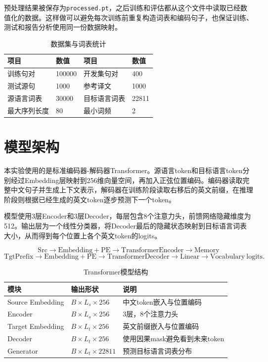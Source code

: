 \documentclass[11pt]{article}
\begin{document}
	预处理结果被保存为\texttt{processed.pt}，之后训练和评估都从这个文件中读取已经数值化的数据。这样做可以避免每次训练前重复构造词表和编码句子，也保证训练、测试和报告分析使用同一份数据映射。

	\begin{table}[H]
		\centering
		\caption{数据集与词表统计}
		\begin{tabular}{M{4.0cm} M{3.2cm} M{4.0cm} M{3.2cm}}
			\toprule
			项目 & 数值 & 项目 & 数值 \\
			\midrule
			训练句对 & 100000 & 开发集句对 & 400 \\
			测试源句 & 1000 & 参考译文 & 1000 \\
			源语言词表 & 30000 & 目标语言词表 & 22811 \\
			最大序列长度 & 80 & 最小词频 & 2 \\
			\bottomrule
		\end{tabular}
	\end{table}

	\section{模型架构}
	本实验使用的是标准编码器-解码器Transformer。源语言token和目标语言token分别经过Embedding层映射到256维向量空间，再加入正弦位置编码。编码器读取完整中文句子并生成上下文表示，解码器在训练阶段读取右移后的英文前缀，在推理阶段则根据已经生成的英文token逐步预测下一个token。

	模型使用3层Encoder和3层Decoder，每层包含8个注意力头，前馈网络隐藏维度为512。输出层为一个线性分类器，将Decoder最后的隐藏状态映射到目标语言词表大小，从而得到每个位置上各个英文token的logits。

	\[
		\mathrm{Src}
		\rightarrow \mathrm{Embedding+PE}
		\rightarrow \mathrm{TransformerEncoder}
		\rightarrow \mathrm{Memory}
	\]
	\[
		\mathrm{TgtPrefix}
		\rightarrow \mathrm{Embedding+PE}
		\rightarrow \mathrm{TransformerDecoder}
		\rightarrow \mathrm{Linear}
		\rightarrow \mathrm{Vocabulary\ logits}.
	\]

	\begin{table}[H]
		\centering
		\caption{Transformer模型结构}
		\begin{tabular}{M{3.4cm} M{3.8cm} M{5.6cm}}
			\toprule
			模块 & 输出形状 & 说明 \\
			\midrule
			Source Embedding & $B\times L_s\times256$ & 中文token嵌入与位置编码 \\
			Encoder & $B\times L_s\times256$ & 3层，8个注意力头 \\
			Target Embedding & $B\times L_t\times256$ & 英文前缀嵌入与位置编码 \\
			Decoder & $B\times L_t\times256$ & 使用因果mask避免看到未来token \\
			Generator & $B\times L_t\times22811$ & 预测目标语言词表分布 \\
			\bottomrule
		\end{tabular}
	\end{table}
\end{document}
